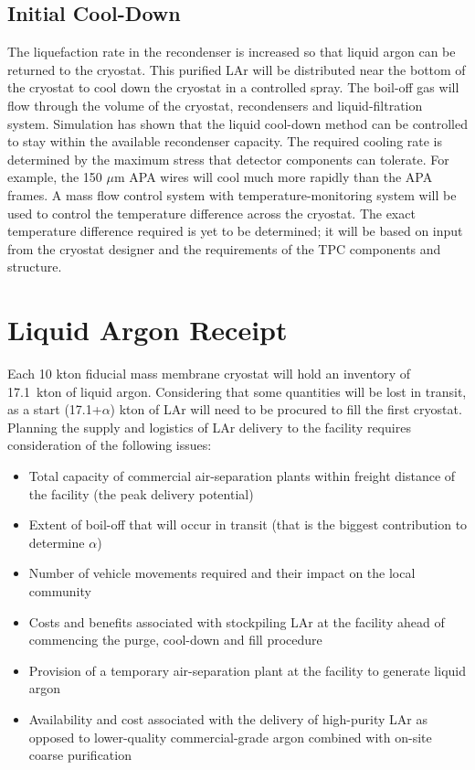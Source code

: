 \subsection{Initial Cool-Down}

The liquefaction rate in the recondenser is increased so that liquid argon can be returned to
the cryostat. This purified LAr will be distributed near
the bottom of the cryostat to cool down the cryostat in a controlled spray.
The boil-off gas will flow through the volume of the cryostat, recondensers
and liquid-filtration system. Simulation
has shown that the liquid cool-down method can
be controlled to stay within the available recondenser capacity. The required cooling rate
is determined by the maximum stress that detector components can
tolerate. For example, the 150 $\mu$m APA wires will cool much more rapidly than the APA frames.
A mass flow control system with temperature-monitoring system will be used to control the
temperature difference across the cryostat. The exact temperature difference required is yet to
be determined; it will be based on input from the cryostat designer and the requirements of
the TPC components and structure.


\section{Liquid Argon Receipt}

Each 10 kton fiducial mass membrane cryostat will hold an inventory 
of 17.1~kton of liquid argon. Considering that some quantities will 
be lost in transit, as a start (17.1+$\alpha$) kton of LAr will need to be 
procured to fill the first cryostat. Planning the supply and logistics 
of LAr delivery to the facility requires consideration of the following issues:

\begin{itemize}
\item  Total capacity of commercial air-separation plants within freight 
distance of the facility (the peak delivery potential)
\item Extent of boil-off that will occur in transit (that is the biggest 
contribution to determine $\alpha$)
\item Number of vehicle movements required and their impact on the local community
\item Costs and benefits associated with stockpiling LAr at the facility
ahead of commencing the purge, cool-down and fill procedure
\item Provision of a temporary air-separation plant at the facility 
to generate liquid argon
\item Availability and cost associated with the delivery of high-purity 
LAr as opposed to lower-quality commercial-grade argon combined with 
on-site coarse purification
\end{itemize}

